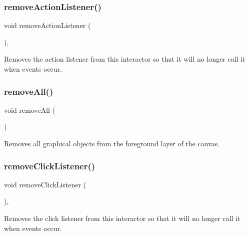 \subsubsection{\texorpdfstring{remove\+Action\+Listener()}{removeActionListener()}}
{\footnotesize\ttfamily void remove\+Action\+Listener (\begin{DoxyParamCaption}{ }\end{DoxyParamCaption})\hspace{0.3cm}{\ttfamily [virtual]}, {\ttfamily [inherited]}}



Removes the action listener from this interactor so that it will no longer call it when events occur. 

\mbox{\label{classGCanvas_a9b0a5a3ad9972ab0e8eb0b54873aac6b}} 
\subsubsection{\texorpdfstring{remove\+All()}{removeAll()}}
{\footnotesize\ttfamily void remove\+All (\begin{DoxyParamCaption}{ }\end{DoxyParamCaption})\hspace{0.3cm}{\ttfamily [virtual]}}



Removes all graphical objects from the foreground layer of the canvas. 

\mbox{\label{classGInteractor_ad39d0325cde6b97ebda4b9d7787c633b}} 
\subsubsection{\texorpdfstring{remove\+Click\+Listener()}{removeClickListener()}}
{\footnotesize\ttfamily void remove\+Click\+Listener (\begin{DoxyParamCaption}{ }\end{DoxyParamCaption})\hspace{0.3cm}{\ttfamily [virtual]}, {\ttfamily [inherited]}}



Removes the click listener from this interactor so that it will no longer call it when events occur. 

